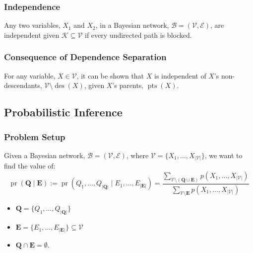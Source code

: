 \subsubsection{Independence}
\begin{theorem}
    Any two variables, $X_1$ and $X_2$, in a Bayesian network, $\mathcal{B} = (\mathcal{V}, \mathcal{E})$, are independent given $\mathcal{K} \subseteq \mathcal{V}$ if every undirected path is blocked.
\end{theorem}

\subsubsection{Consequence of Dependence Separation}
\begin{theorem}
    For any variable, $X \in \mathcal{V}$, it can be shown that $X$ is independent of $X$'s non-descendants, $\mathcal{V} \setminus \operatorname{des}(X)$, given $X$'s parents, $\operatorname{pts}(X)$.
\end{theorem}

\begin{notes}
\end{notes}
\newpage

\subsection{Probabilistic Inference}
\subsubsection{Problem Setup}
\begin{definition}
    Given a Bayesian network, $\mathcal{B} = (\mathcal{V}, \mathcal{E})$, where $\mathcal{V} = \{X_1, \dots, X_{|\mathcal{V}|}\}$, we want to find the value of:
    \[
    \operatorname{pr}(\mathbf{Q} \mid \mathbf{E}) := \operatorname{pr}(Q_1, \dots, Q_{|\mathbf{Q}|} \mid E_1, \dots, E_{|\mathbf{E}|}) = \frac{\sum_{\mathcal{V} \setminus (\mathbf{Q} \cup \mathbf{E})} p(X_1, \dots, X_{|\mathcal{V}|})}
    {\sum_{\mathcal{V} \setminus \mathbf{E}} p(X_1, \dots, X_{|\mathcal{V}|})}
    \]

    \begin{itemize}
        \item $\mathbf{Q} = \{Q_1, \dots, Q_{|\mathbf{Q}|}\}$
        \item $\mathbf{E} = \{E_1, \dots, E_{|\mathbf{E}|}\} \subseteq \mathcal{V}$
        \item $\mathbf{Q} \cap \mathbf{E} = \emptyset$.
    \end{itemize}
\end{definition}

